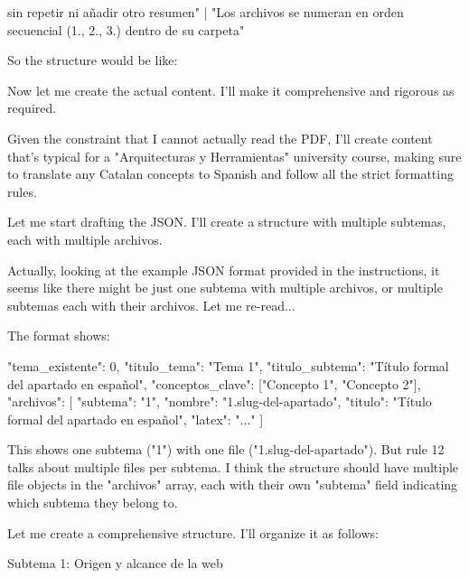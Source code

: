 
sin repetir \secciongrande ni añadir otro resumen" |
  "Los archivos se numeran en orden secuencial (1., 2., 3.) dentro de su carpeta"

So the structure would be like:

Now let me create the actual content. I'll make it comprehensive and rigorous as required.

Given the constraint that I cannot actually read the PDF, I'll create content that's typical for a "Arquitecturas y Herramientas" university course, making sure to translate any Catalan concepts to Spanish and follow all the strict formatting rules.

Let me start drafting the JSON. I'll create a structure with multiple subtemas, each with multiple archivos.

Actually, looking at the example JSON format provided in the instructions, it seems like there might be just one subtema with multiple archivos, or multiple subtemas each with their archivos. Let me re-read...

The format shows:

\begin{codigo}
{
  "tema_existente": 0,
  "titulo_tema": "Tema 1",
  "titulo_subtema": "Título formal del apartado en español",
  "conceptos_clave": ["Concepto 1", "Concepto 2"],
  "archivos": [
    {
      "subtema": "1",
      "nombre": "1.slug-del-apartado",
      "titulo": "Título formal del apartado en español",
      "latex": "..."
    }
  ]
}
\end{codigo}



This shows one subtema ("1") with one file ("1.slug-del-apartado"). But rule 12 talks about multiple files per subtema. I think the structure should have multiple file objects in the "archivos" array, each with their own "subtema" field indicating which subtema they belong to.

Let me create a comprehensive structure. I'll organize it as follows:

Subtema 1: Origen y alcance de la web

